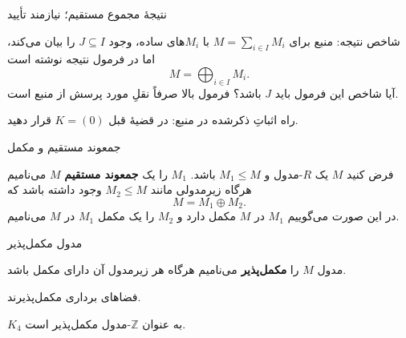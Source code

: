 \begin{frame}[t]{نتیجهٔ مجموع مستقیم؛ نیازمند تأیید}
    \label{lec05:direct-sum-corollary-pending}
    \begin{alertblock}{شاخص نتیجه: }
        منبع برای $M=\sum_{i\in I}M_i$ با $M_i$های ساده،
        وجود $J\subseteq I$ را بیان می‌کند، اما در فرمول نتیجه نوشته است
        \[
            M=\bigoplus_{i\in I}M_i.
        \]
        آیا شاخص این فرمول باید $J$ باشد؟
        فرمول بالا صرفاً نقلِ مورد پرسش از منبع است.
    \end{alertblock}
    راه اثباتِ ذکرشده در منبع: در قضیهٔ قبل $K=(0)$ قرار دهید.
\end{frame}

\begin{frame}[t]{جمعوند مستقیم و مکمل}
    \label{lec05:direct-summand-definition}
    \begin{definition}
        فرض کنید $M$ یک $R$-مدول و $M_1\leq M$ باشد.
        $M_1$ را یک \textbf{جمعوند مستقیم} $M$ می‌نامیم هرگاه
        زیرمدولی مانند $M_2\leq M$ وجود داشته باشد که
        \[
            M=M_1\oplus M_2.
        \]
        در این صورت می‌گوییم $M_1$ در $M$ \alert{مکمل} دارد
        و $M_2$ را یک مکمل $M_1$ در $M$ می‌نامیم.
    \end{definition}
\end{frame}

\begin{frame}[t]{مدول مکمل‌پذیر}
    \label{lec05:complemented-definition-examples}
    \begin{definition}
        مدول $M$ را \textbf{مکمل‌پذیر} می‌نامیم هرگاه
        هر زیرمدول آن دارای مکمل باشد.
    \end{definition}
    \begin{example}
        فضاهای برداری مکمل‌پذیرند.
    \end{example}
    \begin{example}
        $K_4$ به عنوان $\mathbb{Z}$-مدول مکمل‌پذیر است.
    \end{example}
\end{frame}

